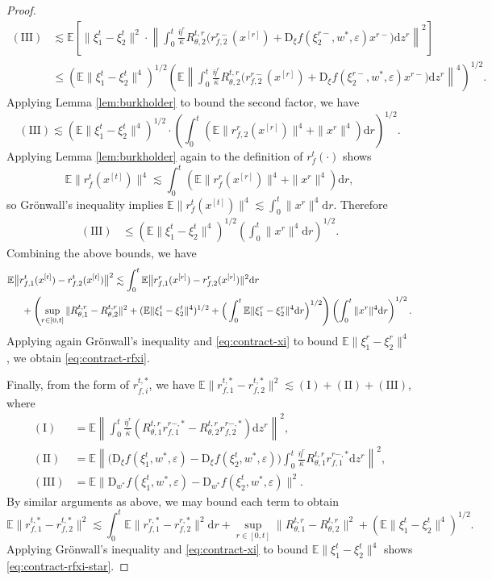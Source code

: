 \documentclass[11pt,letterpaper,reqno]{amsart}
\theoremstyle{definition}
\def\eps{\varepsilon}
\def\d{\mathrm{d}}
\def\D{\mathrm{D}}
\def\E{\mathbb{E}}
\def\nI{(\mathrm{I})}
\def\nII{(\mathrm{II})}
\def\nIII{(\mathrm{III})}
\newcommand{\norm}[1]{\|#1\|}
\newcommand{\prn}[1]{\left({#1}\right)} %
\newcommand{\brk}[1]{\left[{#1}\right]} %
\begin{document}
\begin{proof}
\begin{align*}
\nIII &\lesssim \E\brk{\norm{\xi_1^{t} - \xi_2^{t}}^2 \cdot \left\|
\int_{0}^{t} \frac{\bar\eta^r}{\bar\kappa} R_{\theta,2}^{t,r}\bigl(r_{f,2}^{r-}(x^{[r]})+\D_\xi
f(\xi^{r-}_2,w^*,\eps)x^{r-}\bigr)
\d z^r\right\|^2}\nonumber\\
&\leq (\E \norm{\xi_1^{t} - \xi_2^{t}}^4)^{1/2}\left(\E\left\|
\int_{0}^{t} \frac{\bar\eta^r}{\bar\kappa} R_{\theta,2}^{t,r}\bigl(r_{f,2}^{r-}(x^{[r]})+\D_\xi
f(\xi^{r-}_2,w^*,\eps)x^{r-}\bigr)
\d z^r\right\|^4\right)^{1/2}.
\end{align*}
Applying Lemma \ref{lem:burkholder} to bound the second factor, we have
\[\nIII \lesssim
(\E \norm{\xi_1^{t} - \xi_2^{t}}^4)^{1/2}\cdot \left(\int_0^t
\prn{\E\norm{r_{f,2}^{r}(x^{[r]})}^4 + \norm{x^{r}}^4} \d
r\right)^{1/2}.\]
Applying Lemma \ref{lem:burkholder} again to the definition of
$r_f^t(\cdot)$ shows
\[\E\norm{r_f^{t}(x^{[t]})}^4 \lesssim \int_0^t
\left(\E\norm{r_f^{r}(x^{[r]})}^4+\norm{x^r}^4\right)\d r,\]
so Gr\"onwall's inequality implies
$\E\norm{r_f^{t}(x^{[t]})}^4 \lesssim \int_{0}^{t}\norm{x^r}^4\d r$.
Therefore
\begin{align*}
\nIII &\leq  (\E\norm{\xi_1^{t} - \xi_2^{t}}^4)^{1/2}\left(\int_0^t
\norm{x^{r}}^4 \d r\right)^{1/2}.
\end{align*}
Combining the above bounds, we have
\begin{align*}
&\E\big\|r_{f,1}^{t}(x^{[t]}) - r_{f,2}^{t}(x^{[t]})\big\|^2
\lesssim
\int_0^t \E\big\|r_{f,1}^{r}(x^{[r]}) - r_{f,2}^{r}(x^{[r]})\|^2\d r \\
&\hspace{0.2in}+\left(\sup_{r\in[0,t]}\norm{R_{\theta,1}^{t,r}-R_{\theta,2}^{t,r}}^2+(\E\norm{\xi_1^t-\xi_2^t}^4)^{1/2}
+\Big(\int_0^t \E\norm{\xi_1^r-\xi_2^r}^4\d r\Big)^{1/2}\right)
\left(\int_{0}^{t}\norm{x^{r}}^{4}\d r \right)^{1/2}.
\end{align*}
Applying again Gr\"onwall's inequality and \eqref{eq:contract-xi} to bound
$\E\norm{\xi_1^r-\xi_2^r}^4$, we obtain \eqref{eq:contract-rfxi}.

Finally, from the form of $r_{f,i}^{t,*}$, we have
$\E\norm{r_{f,1}^{t,*}-r_{f,2}^{t,*}}^2 \lesssim \nI+\nII+\nIII$,
where
\begin{align*}
\nI&=\E\left\|\int_0^t \frac{\bar\eta^r}{\bar\kappa}
\prn{R_{\theta,1}^{t,r}r_{f,1}^{r-,*}-R_{\theta,2}^{t,r}r_{f,2}^{r-,*}}\d z^r\right\|^2, \\
\nII&= \E\left\|\Big(\D_\xi f(\xi_1^t,w^*,\eps)-\D_\xi f(\xi_2^t,w^*,\eps)\Big)
\int_0^t \frac{\bar\eta^r}{\bar\kappa}
R_{\theta,1}^{t,r}r_{f,1}^{r-,*}\d z^r\right\|^2,\\
\nIII&=\E\norm{\D_{w^*} f(\xi_1^t,w^*,\eps)-\D_{w^*} f(\xi_2^t,w^*,\eps)}^2.
\end{align*}
By similar arguments as above, we may bound each term to obtain
\[\E\norm{r_{f,1}^{t,*}-r_{f,2}^{t,*}}^2
\lesssim \int_0^t \E\norm{r_{f,1}^{r,*}-r_{f,2}^{r,*}}^2 \d r
+\sup_{r \in [0,t]}\|R_{\theta,1}^{t,r}-R_{\theta,2}^{t,r}\|^2
+(\E\|\xi_1^t-\xi_2^t\|^4)^{1/2}.\]
Applying Gr\"onwall's inequality and \eqref{eq:contract-xi} to bound
$\E\norm{\xi_1^t-\xi_2^t}^4$ shows \eqref{eq:contract-rfxi-star}.
\end{proof}
\end{document}
